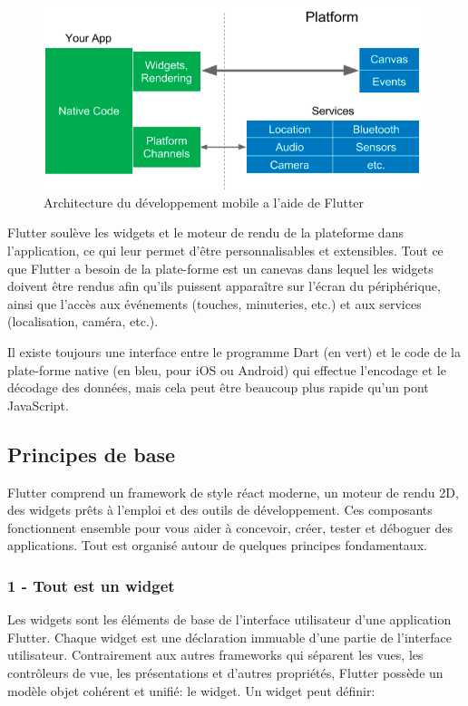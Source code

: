 \begin{figure}[h]
	\begin{center}
		\includegraphics[width=11cm]{Images/chapter2/flutter.png}
		\caption{{\footnotesize Architecture du développement mobile a l'aide de Flutter\cite{leler_whats_2017}}}
	\end{center}
\end{figure}

Flutter soulève les widgets et le moteur de rendu de la plateforme dans l'application, ce qui leur permet d'être personnalisables et extensibles. Tout ce que Flutter a besoin de la plate-forme est un canevas dans lequel les widgets doivent être rendus afin qu’ils puissent apparaître sur l’écran du périphérique, ainsi que l’accès aux événements (touches, minuteries, etc.) et aux services (localisation, caméra, etc.).\medskip

Il existe toujours une interface entre le programme Dart (en vert) et le code de la plate-forme native (en bleu, pour iOS ou Android) qui effectue l’encodage et le décodage des données, mais cela peut être beaucoup plus rapide qu’un pont JavaScript.

\subsection{Principes de base}
Flutter comprend un \gls{framework} de style réact moderne, un moteur de rendu 2D, des widgets prêts à l'emploi et des outils de développement. Ces composants fonctionnent ensemble pour vous aider à concevoir, créer, tester et déboguer des applications. Tout est organisé autour de quelques principes fondamentaux.
\subsubsection{{\large 1 - Tout est un widget}}
Les widgets sont les éléments de base de l’interface utilisateur d’une application Flutter. Chaque widget est une déclaration immuable d'une partie de l'interface utilisateur. Contrairement aux autres frameworks qui séparent les vues, les contrôleurs de vue, les présentations et d'autres propriétés, Flutter possède un modèle objet cohérent et unifié: le widget.
Un widget peut définir:

